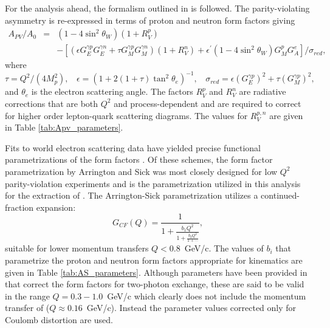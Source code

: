 For the analysis ahead, the formalism outlined in \cite{Lui2007} is followed. The parity-violating asymmetry is re-expressed in terms of proton and neutron form factors giving
\begin{equation}
\begin{array}{lcl}
A_{PV}/A_0&=&(1-4\sin^2\theta_W)(1+R_V^p)\\~&~&-\left[\left(\epsilon G_E^{\gamma p}G_E^{\gamma n}+\tau G_M^{\gamma p}G_M^{\gamma n}\right)(1+R_V^n)+\epsilon^{\prime}(1-4\sin^2\theta_W)G_M^pG_A^e\right]/\sigma_{red},\end{array}
\label{eq:apv_pnFFs}
\end{equation} 
where 
\[
\tau=Q^2/(4M_p^2),~~~~\epsilon=(1+2(1+\tau)\tan^2\theta_e)^{-1},~~~~\sigma_{red}=\epsilon (G_E^{\gamma p})^2+\tau (G_M^{\gamma p})^2,
\]
and $\theta_e$ is the electron scattering angle. The factors $R_{V}^p$ and $R_V^n$ are radiative corrections that are both $Q^2$ and process-dependent and are required to correct for higher order lepton-quark scattering diagrams. The values for $R_V^{p,n}$ are given in Table \ref{tab:Apv_parameters}. 

Fits to world electron scattering data have yielded precise functional parametrizations of the form factors \cite{Galster}\cite{Walcher}\cite{Kelly}\cite{ArringtonSick}\cite{Venkat}. Of these schemes, the form factor parametrization by Arrington and Sick was most closely designed for low $Q^2$ parity-violation experiments and is the parametrization utilized in this analysis for the extraction of \qwp. The Arrington-Sick parametrization utilizes a continued-fraction expansion\cite{ArringtonSick}:
\begin{equation}
G_{CF}(Q)=\frac{1}{1+\frac{b_1Q^2}{1+\frac{b_2Q^2}{1+\cdots}}},
\label{eq:Gcf}
\end{equation} 
suitable for lower momentum transfers $Q<0.8$~GeV/c. The values of $b_i$ that parametrize the proton and neutron form factors appropriate for \Qs kinematics are given in Table \ref{tab:AS_parameters}. Although parameters have been provided in \cite{ArringtonSick} that correct the form factors for two-photon exchange, these are said to be valid in the range $Q=0.3-1.0$~GeV/c which clearly does not include the momentum transfer of \Qs ($Q\approx 0.16$~GeV/c). Instead the parameter values corrected only for Coulomb distortion are used. 

